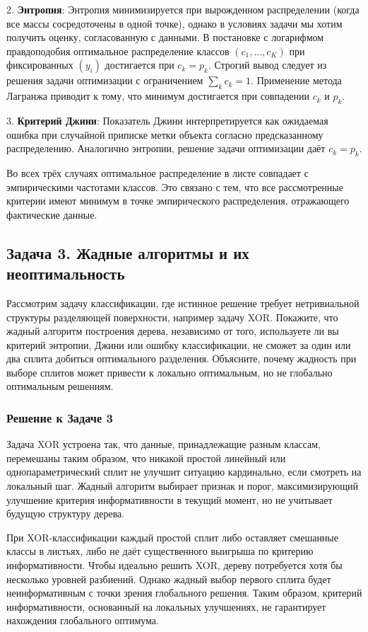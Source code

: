 2. \textbf{Энтропия}:
Энтропия минимизируется при вырожденном распределении (когда все массы сосредоточены в одной точке), однако в условиях задачи мы хотим получить оценку, согласованную с данными. В постановке с логарифмом правдоподобия оптимальное распределение классов \((c_1,\ldots,c_K)\) при фиксированных \((y_i)\) достигается при \(c_k = p_k\). Строгий вывод следует из решения задачи оптимизации с ограничением \(\sum_k c_k = 1\). Применение метода Лагранжа приводит к тому, что минимум достигается при совпадении \(c_k\) и \(p_k\).

3. \textbf{Критерий Джини}:
Показатель Джини интерпретируется как ожидаемая ошибка при случайной приписке метки объекта согласно предсказанному распределению. Аналогично энтропии, решение задачи оптимизации даёт \(c_k = p_k\).

Во всех трёх случаях оптимальное распределение в листе совпадает с эмпирическими частотами классов. Это связано с тем, что все рассмотренные критерии имеют минимум в точке эмпирического распределения, отражающего фактические данные.


\subsection*{Задача 3. Жадные алгоритмы и их неоптимальность}

Рассмотрим задачу классификации, где истинное решение требует нетривиальной структуры разделяющей поверхности, например задачу XOR. Покажите, что жадный алгоритм построения дерева, независимо от того, используете ли вы критерий энтропии, Джини или ошибку классификации, не сможет за один или два сплита добиться оптимального разделения. Объясните, почему жадность при выборе сплитов может привести к локально оптимальным, но не глобально оптимальным решениям.

\subsubsection*{Решение к Задаче 3}

Задача XOR устроена так, что данные, принадлежащие разным классам, перемешаны таким образом, что никакой простой линейный или однопараметрический сплит не улучшит ситуацию кардинально, если смотреть на локальный шаг. Жадный алгоритм выбирает признак и порог, максимизирующий улучшение критерия информативности в текущий момент, но не учитывает будущую структуру дерева.

При XOR-классификации каждый простой сплит либо оставляет смешанные классы в листьях, либо не даёт существенного выигрыша по критерию информативности. Чтобы идеально решить XOR, дереву потребуется хотя бы несколько уровней разбиений. Однако жадный выбор первого сплита будет неинформативным с точки зрения глобального решения. Таким образом, критерий информативности, основанный на локальных улучшениях, не гарантирует нахождения глобального оптимума.


